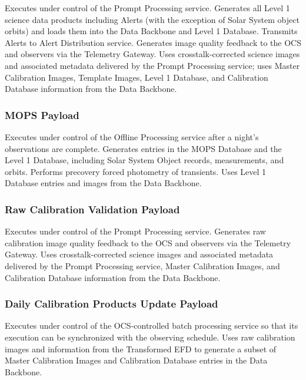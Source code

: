 \documentclass[DM,toc]{lsstdoc}
\begin{document}
Executes under control of the Prompt Processing service. Generates all
Level 1 science data products including Alerts (with the exception of
Solar System object orbits) and loads them into the Data Backbone and
Level 1 Database. Transmits Alerts to Alert Distribution service.
Generates image quality feedback to the OCS and observers via the
Telemetry Gateway. Uses crosstalk-corrected science images and
associated metadata delivered by the Prompt Processing service; uses
Master Calibration Images, Template Images, Level 1 Database, and
Calibration Database information from the Data Backbone.

\subsubsection{MOPS Payload}\label{mops-payload}

Executes under control of the Offline Processing service after a night's
observations are complete. Generates entries in the MOPS Database and
the Level 1 Database, including Solar System Object records,
measurements, and orbits. Performs precovery forced photometry of
transients. Uses Level 1 Database entries and images from the Data
Backbone.

\subsubsection{Raw Calibration Validation
Payload}\label{raw-calibration-validation-payload}

Executes under control of the Prompt Processing service. Generates raw
calibration image quality feedback to the OCS and observers via the
Telemetry Gateway. Uses crosstalk-corrected science images and
associated metadata delivered by the Prompt Processing service, Master
Calibration Images, and Calibration Database information from the Data
Backbone.

\subsubsection{Daily Calibration Products Update
Payload}\label{daily-calibration-products-update-payload}

Executes under control of the OCS-controlled batch processing service so
that its execution can be synchronized with the observing schedule. Uses
raw calibration images and information from the Transformed EFD to
generate a subset of Master Calibration Images and Calibration Database
entries in the Data Backbone.
\end{document}
